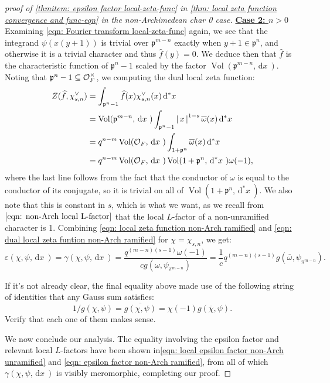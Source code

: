 \documentclass[11pt, x11names]{book}
\newcommand{\pp}{\mathfrak{p}}
\renewcommand{\bar}[1]{\overline{#1}}
\newcommand{\abs}[1]{\left| \, #1  \,\right|}
\renewcommand{\hat}{\widehat}
\newcommand{\dx}{\, \mathrm{d}x \ }
\renewcommand{\d}[1]{\, \mathrm{d}#1 \ }
\DeclareMathOperator{\vol}{Vol}
\begin{document}
\begin{proof}[proof of \ref{thmitem: epsilon factor local-zeta-func} in \ref{thm: local zeta function convergence and func-eqn} in the non-Archimedean char 0 case]
\textbf{\underline{Case 2: $n > 0$}}\\
Examining \ref{eqn: Fourier transform local-zeta-func} again, we see that the integrand $\psi(x(y+1))$ is trivial over $\pp^{m-n}$ exactly when $y + 1 \in \pp^n$, and otherwise it is a trivial character and thus $\hat{f}(y) = 0$. We deduce then that $\hat{f}$ is the characteristic function of $\pp^n - 1$ scaled by the factor $\vol(\pp^{m-n}, \dx)$. Noting that $\pp^n - 1 \subseteq \calo_F^\times$, we computing the dual local zeta function:
\begin{align}
\label{eqn: dual local zeta funtion non-Arch ramified}
    Z(\hat{f}, \chi^\lor_{s, n}) &= \int_{\pp^n - 1} \hat{f}(x) \chi^\lor_{s, n}(x) \d{^*x} \nonumber \\
    &= \vol(\pp^{m-n}, \dx) \int_{\pp^n - 1} \abs{x}^{1-s} \bar{\omega}(x) \d{^*x} \nonumber \\
    &= q^{n-m} \vol(\calo_F, \dx) \int_{1 + \pp^n} \bar{\omega}(x) \d{^*x} \nonumber \\
    &= q^{n-m} \vol(\calo_F, \dx) \vol(1 + \pp^n, \d{^*x}) \omega(-1),
\end{align}
where the last line follows from the fact that the conductor of $\omega$ is equal to the conductor of its conjugate, so it is trivial on all of $\vol(1 + \pp^n, \d{^*x})$. We also note that this is constant in $s$, which is what we want, as we recall from $\ref{eqn: non-Arch local L-factor}$ that the local $L$-factor of a non-unramified character is 1. Combining \ref{eqn: local zeta function non-Arch ramified} and \ref{eqn: dual local zeta funtion non-Arch ramified} for $\chi = \chi_{s, n}$, we get:
\begin{equation}
\label{eqn: epsilon factor non-Arch ramified}
    \varepsilon(\chi, \psi, \dx) = \gamma(\chi, \psi, \dx) = \frac{q^{(m-n)(s-1)} \omega(-1)}{ c g( \omega, \psi_{\pi^{m-n}})} = \frac{1}{c}q^{(m-n)(s-1)}g(\bar{\omega}, \psi_{\pi^{m-n}}).
\end{equation}
\begin{sanitycheck}
    If it's not already clear, the final equality above made use of the following string of identities that any Gauss sum satisfies:
    \begin{equation*}
        1/g(\chi, \psi) = \bar{g(\chi, \psi)} = \chi(-1) g(\bar{\chi}, \psi).
    \end{equation*}
    Verify that each one of them makes sense.
\end{sanitycheck}

We now conclude our analysis. The equality involving the epsilon factor and relevant local $L$-factors have been shown in\ref{eqn: local epsilon factor non-Arch unramified} and \ref{eqn: epsilon factor non-Arch ramified}, from all of which $\gamma(\chi, \psi, \dx)$ is visibly meromorphic, completing our proof.
\end{proof}
\end{document}
